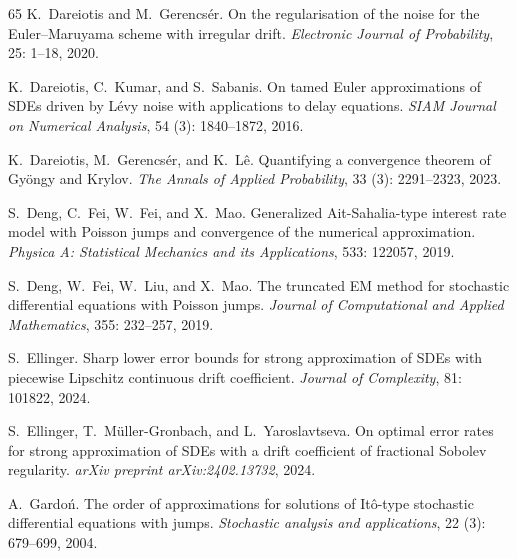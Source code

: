 \documentclass[11pt,a4paper]{article}
\numberwithin{equation}{section}
\theoremstyle{definition}
\begin{document}
{\begin{thebibliography}{65}
K.~Dareiotis and M.~Gerencs{\'e}r.
\newblock On the regularisation of the noise for the {E}uler--{M}aruyama scheme with irregular drift.
\newblock \emph{Electronic Journal of Probability}, 25: 1--18, 2020.

K.~Dareiotis, C.~Kumar, and S.~Sabanis.
\newblock On tamed {E}uler approximations of {SDEs} driven by {L}{\'e}vy noise with applications to delay equations.
\newblock \emph{SIAM Journal on Numerical Analysis}, 54 (3): 1840--1872, 2016.

K.~Dareiotis, M.~Gerencs{\'e}r, and K.~L{\^e}.
\newblock Quantifying a convergence theorem of {G}y{\"o}ngy and {K}rylov.
\newblock \emph{The Annals of Applied Probability}, 33 (3): 2291--2323, 2023.

S.~Deng, C.~Fei, W.~Fei, and X.~Mao.
\newblock Generalized {A}it-{S}ahalia-type interest rate model with {P}oisson jumps and convergence of the numerical approximation.
\newblock \emph{Physica A: Statistical Mechanics and its Applications}, 533: 122057, 2019{}.

S.~Deng, W.~Fei, W.~Liu, and X.~Mao.
\newblock The truncated {EM} method for stochastic differential equations with {P}oisson jumps.
\newblock \emph{Journal of Computational and Applied Mathematics}, 355: 232--257, 2019{}.

S.~Ellinger.
\newblock Sharp lower error bounds for strong approximation of {SDE}s with piecewise {L}ipschitz continuous drift coefficient.
\newblock \emph{Journal of Complexity}, 81: 101822, 2024.

S.~Ellinger, T.~M{\"u}ller-Gronbach, and L.~Yaroslavtseva.
\newblock On optimal error rates for strong approximation of {SDE}s with a drift coefficient of fractional {S}obolev regularity.
\newblock \emph{arXiv preprint arXiv:2402.13732}, 2024.

A.~Gardo{\'n}.
\newblock The order of approximations for solutions of {I}t{\^o}-type stochastic differential equations with jumps.
\newblock \emph{Stochastic analysis and applications}, 22 (3): 679--699, 2004.


\end{thebibliography}}
\end{document}
